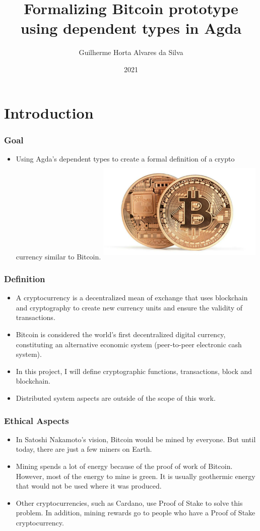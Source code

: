 \documentclass{beamer}
\title{Formalizing Bitcoin prototype \\
  using dependent types in Agda }
\author[Guilherme H. A. Silva]{Guilherme Horta Alvares da Silva}
\date{2021}
\begin{document}
\frame{\titlepage}

\section{Introduction}

\begin{frame}
\frametitle{Goal}
\begin{itemize}
  \item Using Agda's dependent types to create a formal definition of a crypto currency similar to Bitcoin.
    \includegraphics[width=8cm, height=5cm]{TwoBitcoins}
\end{itemize}
\end{frame}

\begin{frame}
   \frametitle{Definition}
\begin{itemize}[<+->]
     \item A cryptocurrency is a decentralized mean of exchange that uses
       blockchain and cryptography to create new currency units and ensure the validity of transactions.
     \item Bitcoin is considered the world's first decentralized digital currency,
       constituting an alternative economic system (peer-to-peer electronic cash system).
     \item In this project, I will define cryptographic functions, transactions, block and blockchain.
     \item Distributed system aspects are outside of the scope of this work.
     \end{itemize}
\end{frame}

\begin{frame}
   \frametitle{Ethical Aspects}
\begin{itemize}[<+->]
  \item In Satoshi Nakamoto's vision, Bitcoin would be mined by everyone.
    But until today, there are just a few miners on Earth.
  \item Mining spends a lot of energy because of the proof of work of Bitcoin.
    However, most of the energy to mine is green. It is usually geothermic energy that would not be used where it was produced.
  \item Other cryptocurrencies, such as Cardano, use Proof of Stake to solve this problem. In addition, mining rewards go to people who have a Proof of Stake cryptocurrency.
\end{itemize}
\end{frame}
\end{document}
